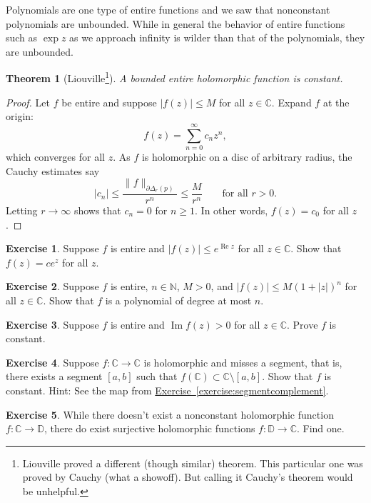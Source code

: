 \documentclass[12pt,openany]{book}
\renewcommand{\Re}{\operatorname{Re}}
\renewcommand{\Im}{\operatorname{Im}}
\newcommand{\sabs}[1]{\lvert {#1} \rvert}
\newcommand{\snorm}[1]{\lVert {#1} \rVert}
\newcommand{\C}{{\mathbb{C}}}
\newcommand{\N}{{\mathbb{N}}}
\newcommand{\D}{{\mathbb{D}}}
\theoremstyle{plain}
\newtheorem{thm}{Theorem}[section]
\theoremstyle{remark}
\theoremstyle{definition}
\newenvironment{exbox}{%
    \def\FrameCommand{\vrule width 1pt \relax\hspace{10pt}}%
    \MakeFramed{\advance\hsize-\width\FrameRestore}%
}{%
    \endMakeFramed
}
\theoremstyle{exercise}
\newtheorem{exercise}{Exercise}[section]
\theoremstyle{example}
\newcommand{\exerciseref}[1]{\hyperref[#1]{Exercise~\ref*{#1}}}
\begin{document}
Polynomials are one type of entire functions and we saw that 
nonconstant polynomials are unbounded.  While in general the behavior of
entire functions such as $\exp z$ as we approach infinity is wilder than that of the
polynomials, they are unbounded.

\begin{thm}[Liouville\footnote{%
Liouville proved a different (though similar) theorem.  This particular one
was proved by Cauchy (what a showoff).  But calling it Cauchy's theorem would be
unhelpful.}]
%
\label{thm:Liouville}%
A bounded entire holomorphic function is constant.
\end{thm}

\begin{proof}
Let $f$ be entire and suppose $\sabs{f(z)} \leq M$ for all $z \in \C$.
Expand $f$ at the origin:
\begin{equation*}
f(z) = \sum_{n=0}^\infty c_n z^n ,
\end{equation*}
which converges for all $z$.
As $f$ is holomorphic on a disc of arbitrary radius, the Cauchy estimates
say
\begin{equation*}
\sabs{c_n} \leq \frac{\snorm{f}_{\partial \Delta_r(p)}}{r^n} \leq
\frac{M}{r^n}
\qquad \text{for all } r > 0 .
\end{equation*}
Letting $r \to \infty$ shows that $c_n = 0$ for $n \geq 1$.  In other
words, $f(z) = c_0$ for all $z$.
\end{proof}

\begin{exbox}
\begin{exercise}
Suppose $f$ is entire and $\sabs{f(z)} \leq e^{\Re z}$ for all $z \in
\C$.  Show that $f(z) = c e^z$ for all $z$.
\end{exercise}

\begin{exercise}
Suppose $f$ is entire, $n \in \N$, $M > 0$, and
$\sabs{f(z)} \leq M {(1+\sabs{z})}^n$ for all $z \in \C$.
Show that $f$ is a polynomial of degree at most $n$.
\end{exercise}

\begin{exercise}
Suppose $f$ is entire and $\Im f(z) > 0$ for all $z \in \C$.
Prove $f$ is constant.
\end{exercise}

\begin{exercise}
Suppose $f \colon \C \to \C$ is holomorphic and misses a segment,
that is, there exists a segment
$[a,b]$ such that $f(\C) \subset \C \setminus [a,b]$.
Show that $f$ is constant.  Hint: See the map from
\exerciseref{exercise:segmentcomplement}.
\end{exercise}

\begin{exercise}
While there doesn't exist a nonconstant holomorphic function $f \colon \C
\to \D$, there do exist surjective holomorphic functions $f \colon \D \to
\C$.  Find one.
\end{exercise}
\end{exbox}
\end{document}
